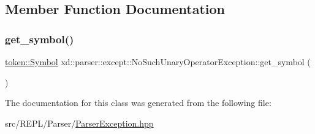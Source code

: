 \subsection{Member Function Documentation}
\mbox{\label{classxd_1_1parser_1_1except_1_1_no_such_unary_operator_exception_a861aec9b0e58694129a4d2e257392777}} 
\subsubsection{\texorpdfstring{get\+\_\+symbol()}{get\_symbol()}}
{\footnotesize\ttfamily \mbox{\hyperlink{classxd_1_1parser_1_1token_1_1_symbol}{token\+::\+Symbol}} xd\+::parser\+::except\+::\+No\+Such\+Unary\+Operator\+Exception\+::get\+\_\+symbol (\begin{DoxyParamCaption}{ }\end{DoxyParamCaption})\hspace{0.3cm}{\ttfamily [inline]}}



The documentation for this class was generated from the following file\+:\begin{DoxyCompactItemize}
\item 
src/\+R\+E\+P\+L/\+Parser/\mbox{\hyperlink{_parser_exception_8hpp}{Parser\+Exception.\+hpp}}\end{DoxyCompactItemize}
